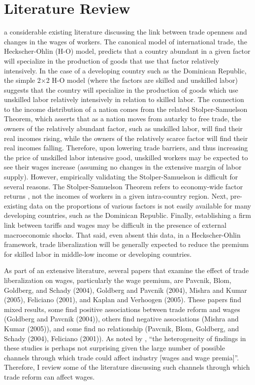 \chapter{Literature Review}
\label{sec:Litreview}

 a considerable existing literature discussing the link between trade openness
and changes in the wages of workers.
The canonical model of international trade, the Heckscher-Ohlin (H-O) model, 
predicts that a country abundant in a given factor will specialize 
in the production of goods that use that factor relatively intensively.
In the case of a developing country such as the Dominican Republic, the 
simple 2$\times$2 H-O model (where the factors are skilled and unskilled labor) suggests that the 
country will specialize in the production of goods
which use unskilled labor relatively intensively in relation to skilled labor. 
The connection to the income distribution of a nation comes from the related Stolper-Samuelson Theorem,
which asserts that as a nation moves from autarky to free trade, the owners of the relatively
abundant factor, such as unskilled labor, will find their real incomes rising, while the owners of
the relatively scarce factor will find their real incomes falling. 
Therefore, upon lowering trade barriers, and thus increasing the price of unskilled labor intensive
good, unskilled workers may be expected to see their wages
increase (assuming no changes in the extensive margin of labor supply). However, empirically 
validating the Stolper-Samuelson is difficult for several reasons. 
The Stolper-Samuelson Theorem refers to economy-wide factor returns \citep{goldberg}, not the 
incomes of workers in a  given intra-country region. Next, pre-existing data on the  proportions
of various factors is not easily available for many developing countries, such as the Dominican Republic.
Finally, establishing a firm link between tariffs and wages may be difficult in the presence of external
macroeconomic shocks. That said, even absent this data, in a Heckscher-Ohlin framework, trade 
liberalization will be generally expected to reduce the premium for skilled labor in middle-low 
income or developing countries. 

As part of an extensive literature, several papers that examine the effect of trade liberalization on 
wages, particularly the wage premium, are Pavcnik, Blom, Goldberg, and Schady (2004), Goldberg
and Pavcnik (2004), Mishra and Kumar (2005), Feliciano (2001), and Kaplan and Verhoogen (2005).
These papers find mixed results, some find positive associations between trade reform and wages 
(Goldberg and Pavcnik (2004)), others find negative associations (Mishra and Kumar (2005)), and some 
find no relationship (Pavcnik, Blom, Goldberg, and Schady (2004), Feliciano (2001)). As noted by 
\citet{goldberg}, ``the heterogeneity of findings in these studies is perhaps not surprising 
given the large number of possible channels through which trade could affect industry [wages 
and wage premia]''. Therefore, I review some of the literature discussing such channels through
which trade reform can affect wages.

